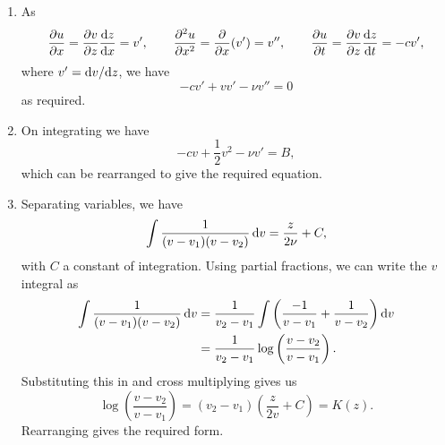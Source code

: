 \documentclass[a4paper, 12pt]{article}
\begin{document}
\begin{enumerate}[label={\bf \arabic{*}.\;}, ref={\arabic{*}},itemsep=3ex, left=0ex]
{\begin{enumerate}[label=(\alph*)]
      \end{enumerate}
    }
    {
      \begin{enumerate}[label=(\alph*)]
        \item{
            As
            \begin{equation}
              \pd{u}{x} = \pd{v}{z}\fd{z}{x}=v', \qquad
              \pdd{u}{x} = \pd{}{x}(v') = v'', \qquad
              \pd{u}{t} = \pd{v}{z}\fd{z}{t}= -cv',
            \end{equation}
            where $v'=\fd{v}{z}$, we have
            \begin{equation}
              -cv' + vv' -\nu v'' =0
            \end{equation}
            as required.
          }
        \item{
            On integrating we have
            \begin{equation}
              -cv + \frac{1}{2}v^2 -\nu v' =B,
            \end{equation}
            which can be rearranged to give the required equation.
          }
        \item{
            Separating variables, we have
            \begin{equation}
              \int\frac{1}{(v-v_1)(v-v_2)}\,{\mathrm d}{v} = \frac{z}{2\nu} + C,
            \end{equation}
            with $C$ a constant of integration.
            Using partial fractions, we can write the $v$ integral as
            \begin{align}
              \int\frac{1}{(v-v_1)(v-v_2)} \,{\mathrm d}{v} &= \frac{1}{v_2-v_1}\int\left(\frac{-1}{v-v_1} + \frac{1}{v-v_2}\right){\mathrm d}{v} \\
              & = \frac{1}{v_2-v_1}\log\left(\frac{v-v_2}{v-v_1}\right).
            \end{align}
            Substituting this in and cross multiplying gives us
            \begin{equation}
              \log\left(\frac{v-v_2}{v-v_1}\right) = (v_2-v_1)\left( \frac{z}{2v}+C\right) = K(z).
            \end{equation}
            Rearranging gives the required form.
          }
      \end{enumerate}

    }



\end{enumerate}
\end{document}
